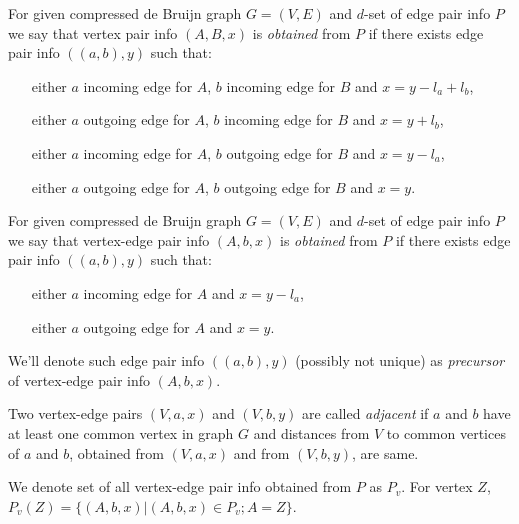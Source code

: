 \documentclass[12pt,a4paper,oneside]{article}
\begin{document}
For given compressed de Bruijn graph $G=(V,E)$ and $d$-set of edge pair info $P$ 
we say that vertex pair info $(A, B, x)$ is \emph{obtained} from $P$ if there exists edge pair info $((a,b),y)$ such that:
\begin{itemize}
\item[either] $a$ incoming edge for $A$, $b$ incoming edge for $B$ and $x=y-l_a+l_b$, 
\item[either] $a$ outgoing edge for $A$, $b$ incoming edge for $B$ and $x=y+l_b$, 
\item[either] $a$ incoming edge for $A$, $b$ outgoing edge for $B$ and $x=y-l_a$, 
\item[either] $a$ outgoing edge for $A$, $b$ outgoing edge for $B$ and $x=y$. 
\end{itemize} 

For given compressed de Bruijn graph $G=(V,E)$ and $d$-set of edge pair info $P$ 
we say that vertex-edge pair info $(A, b, x)$ is \emph{obtained} from $P$ if there exists edge pair info $((a,b),y)$ such that:
\begin{itemize}
\item[either] $a$ incoming edge for $A$ and $x=y-l_a$, 
\item[either] $a$ outgoing edge for $A$ and $x=y$. 
\end{itemize} 
We'll denote such edge pair info $((a, b), y)$ (possibly not unique) as \emph{precursor} of vertex-edge pair info $(A, b, x)$.

Two vertex-edge pairs $(V,a,x)$ and $(V,b,y)$ are called \emph{adjacent} if $a$ and $b$ have at least one common vertex in graph $G$ and distances from $V$ to common vertices of $a$ and $b$, obtained from $(V,a,x)$ and from $(V,b,y)$, are same. 


We denote set of all vertex-edge pair info obtained from $P$ as $P_v$.
For vertex $Z$, $P_v(Z) = \{(A, b, x)|(A, b, x) \in P_v; A = Z\}$.
 
\end{document}
